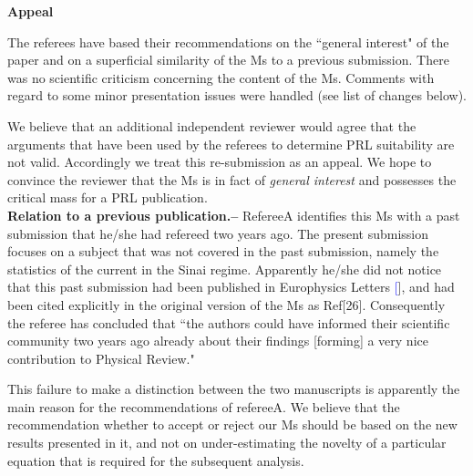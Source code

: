 \documentclass[aps,prl,floats,floatfix,twocolumn]{revtex4}
\newcommand{\sect}[1]{{\bf #1.-- }}
\renewcommand{\cite}[1]{\textcolor{blue}{[\onlinecite{#1}}]} %
\begin{document}
\clearpage






\onecolumngrid

\begin{center}
{\LARGE\bf Appeal}
\end{center}

The referees have based their recommendations on the ``general interest" of the paper 
and on a superficial similarity of the Ms to a previous submission. 
There was no scientific criticism concerning the content 
of the Ms. Comments with regard to some minor presentation 
issues were handled (see list of changes below).


We believe that an additional independent reviewer would agree 
that the arguments that have been used by the referees 
to determine PRL suitability are not valid. 
Accordingly we treat this re-submission as an appeal. 
We hope to convince the reviewer that the Ms is in fact 
of {\em general interest} 
and possesses the critical mass for a PRL publication. \\

\sect{Relation to a previous publication}
%
RefereeA identifies this Ms with a past submission that he/she had refereed two years ago. The present submission focuses on a subject that was not covered in the past submission, namely the statistics of the current in the Sinai regime. Apparently he/she did not notice that this past submission had been published in Europhysics Letters \cite{ner}, 
and had been cited explicitly in the original version of the Ms as Ref[26]. 
Consequently the referee has concluded that \textsf{``the authors could have informed their scientific community two years ago already about their findings [forming] a very nice contribution to Physical Review."}

This failure to make a distinction between the two manuscripts is apparently the main reason for the recommendations of refereeA. We believe that the recommendation whether to accept or reject our Ms should be based on the new results presented in it, and not on under-estimating the novelty of a particular equation that is required for the subsequent analysis.  \\ 
\end{document}
